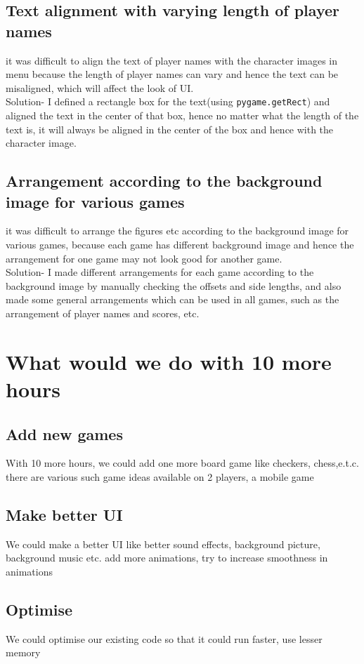 \documentclass[12pt]{article}
\begin{document}
\subsection{Text alignment with varying length of player names}
it was difficult to align the text of player names with the character images in menu because the length of player names can vary and hence the text can be misaligned, which will affect the look of UI.
\\
Solution- I defined a rectangle box for the text(using \texttt{pygame.getRect}) and aligned the text in the center of that box, hence no matter what the length of the text is, it will always be aligned in the center of the box and hence with the character image.
\subsection{Arrangement according to the background image for various games}
it was difficult to arrange the figures etc according to the background image for various games, because each game has different background image and hence the arrangement for one game may not look good for another game.
\\
Solution- I made different arrangements for each game according to the background image by manually checking the offsets and side lengths, and also made some general arrangements which can be used in all games, such as the arrangement of player names and scores, etc.
\section{What would we do with 10 more hours}
\subsection{Add new games}
With 10 more hours, we could add one more board game like checkers, chess,e.t.c.
there are various such game ideas available on 2 players, a mobile game
\subsection{Make better UI}
We could make a better UI like better sound effects, background picture, background music etc.
add more animations, try to increase smoothness in animations
\subsection{Optimise}
We could optimise our existing code so that it could run faster, use lesser memory
\end{document}
